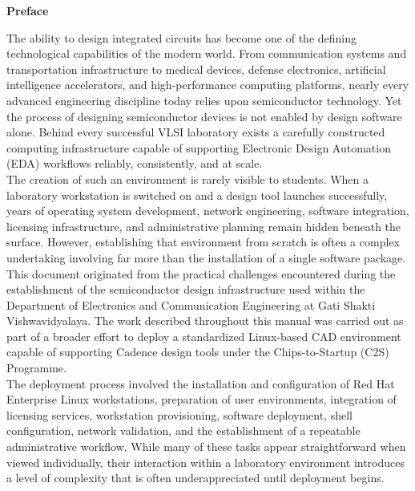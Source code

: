 \begin{center}
{\headingfont\LARGE\bfseries Preface} \\
\end{center}


The ability to design integrated circuits has become one of the defining technological capabilities of the modern world. From communication systems and transportation infrastructure to medical devices, defense electronics, artificial intelligence accelerators, and high-performance computing platforms, nearly every advanced engineering discipline today relies upon semiconductor technology. Yet the process of designing semiconductor devices is not enabled by design software alone. Behind every successful VLSI laboratory exists a carefully constructed computing infrastructure capable of supporting Electronic Design Automation (EDA) workflows reliably, consistently, and at scale. \\

The creation of such an environment is rarely visible to students. When a laboratory workstation is switched on and a design tool launches successfully, years of operating system development, network engineering, software integration, licensing infrastructure, and administrative planning remain hidden beneath the surface. However, establishing that environment from scratch is often a complex undertaking involving far more than the installation of a single software package. \\

This document originated from the practical challenges encountered during the establishment of the semiconductor design infrastructure used within the Department of Electronics and Communication Engineering at Gati Shakti Vishwavidyalaya. The work described throughout this manual was carried out as part of a broader effort to deploy a standardized Linux-based CAD environment capable of supporting Cadence design tools under the Chips-to-Startup (C2S) Programme. \\

The deployment process involved the installation and configuration of Red Hat Enterprise Linux workstations, preparation of user environments, integration of licensing services, workstation provisioning, software deployment, shell configuration, network validation, and the establishment of a repeatable administrative workflow. While many of these tasks appear straightforward when viewed individually, their interaction within a laboratory environment introduces a level of complexity that is often underappreciated until deployment begins. \\

